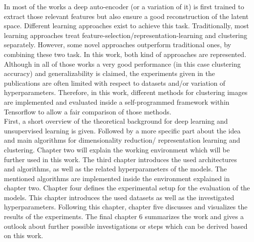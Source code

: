 \documentclass[12pt,DIV14,BCOR12mm,a4paper,footexclude,headinclude,halfparskip-,twoside,openright,cleardoubleempty,idxtotoc,bibtotoc,listtotoc]{scrreprt} %
\numberwithin{equation}{chapter}
\begin{document}
In most of the works a deep auto-encoder (or a variation of it) is first trained to extract those relevant features but also ensure a good reconstruction of the latent space. Different learning approaches exist to achieve this task. Traditionally, most learning approaches treat feature-selection/representation-learning and clustering separately. However, some novel approaches outperform traditional ones, by combining these two task. In this work, both kind of approaches are represented. Although in all of those works a very good performance (in this case clustering accuracy) and generalizability is claimed, the experiments given in the publications are often limited with respect to datasets and/or variation of hyperparameters. Therefore, in this work, different methods for clustering images are implemented and evaluated inside a self-programmed framework within Tensorflow to allow a fair comparison of those methods.\\
First, a short overview of the theoretical background for deep learning and unsupervised learning is given. Followed by a more specific part about the idea and main algorithms for dimensionality reduction/ representation learning and clustering. Chapter two will explain the working environment which will be further used in this work. The third chapter introduces the used architectures and algorithms, as well as the related hyperparameters of the models. The mentioned algorithms are implemented inside the environment explained in chapter two. Chapter four defines the experimental setup for the evaluation of the models. This chapter introduces the used datasets as well as the investigated hyperparameters. Following this chapter, chapter five discusses and visualizes the results of the experiments. The final chapter 6 summarizes the work and gives a outlook about further possible investigations or steps which can be derived based on this work.
\end{document}
